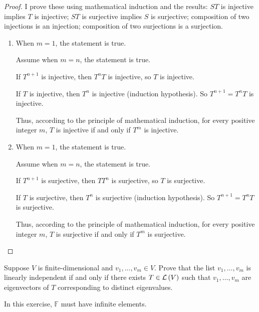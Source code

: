 \begin{proof}
    I prove these using mathematical induction and the results: $ST$ is injective implies $T$ is injective; $ST$ is surjective implies $S$ is surjective; composition of two injections is an injection; composition of two surjections is a surjection.

    \begin{enumerate}[label={(\alph*)}]
        \item When $m = 1$, the statement is true.

              Assume when $m = n$, the statement is true.

              If $T^{n+1}$ is injective, then $T^{n}T$ is injective, so $T$ is injective.

              If $T$ is injective, then $T^{n}$ is injective (induction hypothesis). So $T^{n+1} = T^{n}T$ is injective.

              Thus, according to the principle of mathematical induction, for every positive integer $m$, $T$ is injective if and only if $T^{m}$ is injective.
        \item When $m = 1$, the statement is true.

              Assume when $m = n$, the statement is true.

              If $T^{n+1}$ is surjective, then $TT^{n}$ is surjective, so $T$ is surjective.

              If $T$ is surjective, then $T^{n}$ is surjective (induction hypothesis). So $T^{n+1} = T^{n}T$ is surjective.

              Thus, according to the principle of mathematical induction, for every positive integer $m$, $T$ is surjective if and only if $T^{m}$ is surjective.
    \end{enumerate}
\end{proof}
\newpage

\begin{exercise}
    Suppose $V$ is finite-dimensional and $v_{1}, \ldots, v_{m} \in V$. Prove that the list $v_{1} , \ldots, v_{m}$ is linearly independent if and only if there exists $T \in \mathcal{L}\left({V}\right)$ such that $v_{1} , \ldots, v_{m}$ are eigenvectors of $T$ corresponding to distinct eigenvalues.
\end{exercise}

In this exercise, $\mathbb{F}$ must have infinite elements.


